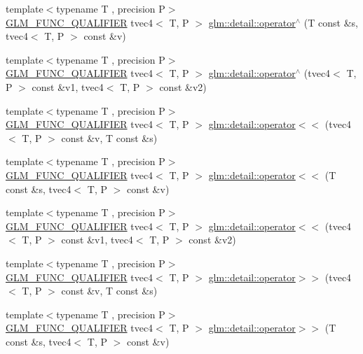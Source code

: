 \begin{DoxyCompactItemize}
{\footnotesize template$<$typename T , precision P$>$ }\\\hyperlink{setup_8hpp_a33fdea6f91c5f834105f7415e2a64407}{G\+L\+M\+\_\+\+F\+U\+N\+C\+\_\+\+Q\+U\+A\+L\+I\+F\+I\+ER} tvec4$<$ T, P $>$ \hyperlink{namespaceglm_1_1detail_a9c0109cbd4e525d993fe60b4172f675d}{glm\+::detail\+::operator$^\wedge$} (T const \&s, tvec4$<$ T, P $>$ const \&v)
\item 
{\footnotesize template$<$typename T , precision P$>$ }\\\hyperlink{setup_8hpp_a33fdea6f91c5f834105f7415e2a64407}{G\+L\+M\+\_\+\+F\+U\+N\+C\+\_\+\+Q\+U\+A\+L\+I\+F\+I\+ER} tvec4$<$ T, P $>$ \hyperlink{namespaceglm_1_1detail_ae879e01cd66ed9a3a9b0dc16ff32ffc2}{glm\+::detail\+::operator$^\wedge$} (tvec4$<$ T, P $>$ const \&v1, tvec4$<$ T, P $>$ const \&v2)
\item 
{\footnotesize template$<$typename T , precision P$>$ }\\\hyperlink{setup_8hpp_a33fdea6f91c5f834105f7415e2a64407}{G\+L\+M\+\_\+\+F\+U\+N\+C\+\_\+\+Q\+U\+A\+L\+I\+F\+I\+ER} tvec4$<$ T, P $>$ \hyperlink{namespaceglm_1_1detail_a41300b82bbaea97ab5fdb1799c7c943f}{glm\+::detail\+::operator$<$$<$} (tvec4$<$ T, P $>$ const \&v, T const \&s)
\item 
{\footnotesize template$<$typename T , precision P$>$ }\\\hyperlink{setup_8hpp_a33fdea6f91c5f834105f7415e2a64407}{G\+L\+M\+\_\+\+F\+U\+N\+C\+\_\+\+Q\+U\+A\+L\+I\+F\+I\+ER} tvec4$<$ T, P $>$ \hyperlink{namespaceglm_1_1detail_a3ced5637a42eef30a25bcb570e8a3ae0}{glm\+::detail\+::operator$<$$<$} (T const \&s, tvec4$<$ T, P $>$ const \&v)
\item 
{\footnotesize template$<$typename T , precision P$>$ }\\\hyperlink{setup_8hpp_a33fdea6f91c5f834105f7415e2a64407}{G\+L\+M\+\_\+\+F\+U\+N\+C\+\_\+\+Q\+U\+A\+L\+I\+F\+I\+ER} tvec4$<$ T, P $>$ \hyperlink{namespaceglm_1_1detail_a5390170eef69a0b205934ed81d963d5c}{glm\+::detail\+::operator$<$$<$} (tvec4$<$ T, P $>$ const \&v1, tvec4$<$ T, P $>$ const \&v2)
\item 
{\footnotesize template$<$typename T , precision P$>$ }\\\hyperlink{setup_8hpp_a33fdea6f91c5f834105f7415e2a64407}{G\+L\+M\+\_\+\+F\+U\+N\+C\+\_\+\+Q\+U\+A\+L\+I\+F\+I\+ER} tvec4$<$ T, P $>$ \hyperlink{namespaceglm_1_1detail_a12cdb3963759aba8faa168a01095eb85}{glm\+::detail\+::operator$>$$>$} (tvec4$<$ T, P $>$ const \&v, T const \&s)
\item 
{\footnotesize template$<$typename T , precision P$>$ }\\\hyperlink{setup_8hpp_a33fdea6f91c5f834105f7415e2a64407}{G\+L\+M\+\_\+\+F\+U\+N\+C\+\_\+\+Q\+U\+A\+L\+I\+F\+I\+ER} tvec4$<$ T, P $>$ \hyperlink{namespaceglm_1_1detail_ad496e7b4e33d86d2d333ce4f28d52435}{glm\+::detail\+::operator$>$$>$} (T const \&s, tvec4$<$ T, P $>$ const \&v)

\end{DoxyCompactItemize}
